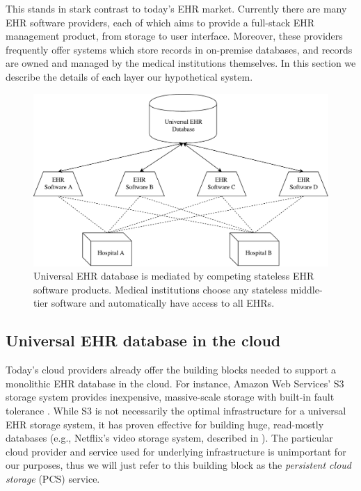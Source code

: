 This stands in stark contrast to today's EHR market. Currently there are many EHR software providers, each of which aims to provide a full-stack EHR management product, from storage to user interface. Moreover, these providers frequently offer systems which store records in on-premise databases, and records are owned and managed by the medical institutions themselves. In this section we describe the details of each layer our hypothetical system.

\begin{figure}
\includegraphics[scale=0.3]{system-diagram}
\caption{Universal EHR database is mediated by competing stateless EHR software products. Medical institutions choose any stateless middle-tier software and automatically have access to all EHRs.}
\label{fig:system-diagram}
\end{figure}

\subsection{Universal EHR database in the cloud}\label{sec:database}
Today's cloud providers already offer the building blocks needed to support a monolithic EHR database in the cloud. For instance, Amazon Web Services' S3 storage system provides inexpensive, massive-scale storage with built-in fault tolerance \cite{aws-s3}. While S3 is not necessarily the optimal infrastructure for a universal EHR storage system, it has proven effective for building huge, read-mostly databases (e.g., Netflix's video storage system, described in \cite{netflix-s3}). The particular cloud provider and service used for underlying infrastructure is unimportant for our purposes, thus we will just refer to this building block as the \textit{persistent cloud storage} (PCS) service.

